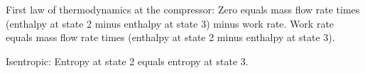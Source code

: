 First law of thermodynamics at the compressor:  
Zero equals mass flow rate times (enthalpy at state 2 minus enthalpy at state 3) minus work rate.  
Work rate equals mass flow rate times (enthalpy at state 2 minus enthalpy at state 3).  

Isentropic:  
Entropy at state 2 equals entropy at state 3.